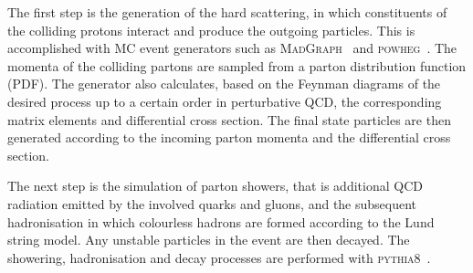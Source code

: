 The first step is the generation of the hard scattering, in which constituents 
of the colliding protons interact and produce the outgoing particles. This is 
accomplished with MC event generators such as 
\textsc{MadGraph}~\cite{madgraph} and \textsc{powheg}~\cite{powheg}. 
The momenta of the colliding partons are sampled from a parton distribution 
function (PDF). 
The generator also calculates, based on the Feynman diagrams of the desired 
process up to a certain order in perturbative QCD, the corresponding matrix 
elements and differential cross section. The final state particles are then 
generated according to the incoming parton momenta and the differential cross 
section.

The next step is the simulation of parton showers, that is additional QCD 
radiation emitted by the involved quarks and gluons, and the subsequent 
hadronisation in which colourless hadrons are formed according to the Lund 
string model. Any unstable particles in the event are then decayed. The 
showering, hadronisation and decay processes are performed with 
\textsc{pythia8}~\cite{pythia}.

